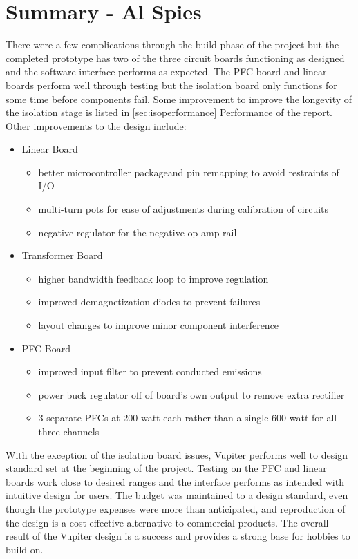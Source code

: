 \documentclass[15pt]{article}
\begin{document}
\section{Summary - Al Spies}
There were a few complications through the build phase of the project but the completed prototype has two of the three circuit boards functioning as designed and the software interface performs as expected. The PFC board and linear boards perform well through testing but the isolation board only functions for some time before components fail. Some improvement to improve the longevity of the isolation stage is listed in \autoref{sec:isoperformance} Performance of the report. Other improvements to the design include:
\begin{singlespace}
\begin{itemize}
    \item Linear Board\begin{itemize}
        \item better microcontroller packageand pin remapping to avoid restraints of I/O
        \item multi-turn pots for ease of adjustments during calibration of circuits
        \item negative regulator for the negative op-amp rail
    \end{itemize}
    \item Transformer Board\begin{itemize}
        \item higher bandwidth feedback loop to improve regulation
        \item improved demagnetization diodes to prevent failures
        \item layout changes to improve minor component interference
    \end{itemize}
    \item PFC Board\begin{itemize}
    \item improved input filter to prevent conducted emissions 
    \item power buck regulator off of board's own output to remove extra rectifier
    \item 3 separate PFCs at 200 watt each rather than a single 600 watt for all three channels
    \end{itemize}
\end{itemize}
\end{singlespace}
With the exception of the isolation board issues, Vupiter performs well to design standard set at the beginning of the project. Testing on the PFC and linear boards work close to desired ranges and the interface performs as intended with intuitive design for users. The budget was maintained to a design standard, even though the prototype expenses were more than anticipated, and reproduction of the design is a cost-effective alternative to commercial products. The overall result of the Vupiter design is a success and provides a strong base for hobbies to build on.
\noindent
\end{document}
